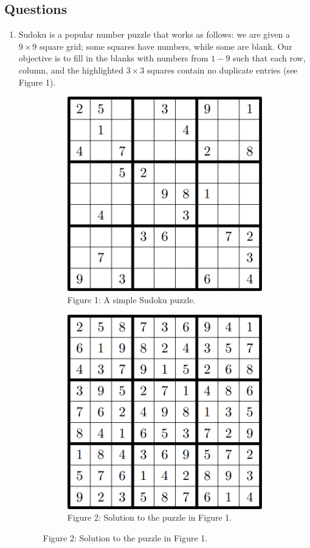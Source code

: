 \subsection*{Questions}

\begin{enumerate}
    \item Sudoku is a popular number puzzle that works as follows: we are given a $9 \times 9$ square grid; some squares have numbers, while some are blank. Our objective is to fill in the blanks with numbers from $1 - 9$ such that each row, column, and the highlighted $3 \times 3$ squares contain no duplicate entries (see Figure 1).

    \begin{figure}[ht!]
        \centering

        \begin{subfigure}[t]{0.45\linewidth}
            \centering
            \includegraphics[width=0.5\linewidth]{figures/tut1-fig1.png}
            \caption*{Figure 1: A simple Sudoku puzzle.}
        \end{subfigure}
        \begin{subfigure}[t]{0.45\linewidth}
            \centering
            \includegraphics[width=0.5\linewidth]{figures/tut1-fig2.png}
            \caption*{Figure 2: Solution to the puzzle in Figure 1.}
        \end{subfigure}
    \end{figure}


\end{enumerate}

